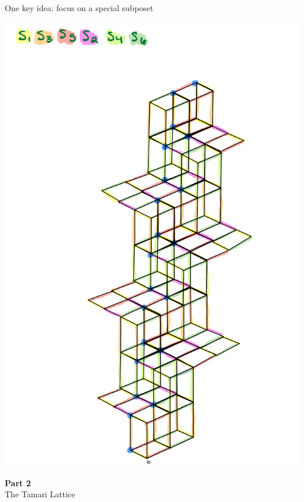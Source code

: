 \documentclass[xcolor=x11names,compress,t]{beamer}
\begin{document}
\begin{frame}{One key idea: focus on a special subposet}
    \begin{center}
        \includegraphics[scale = .105]{lattice.png}
    \end{center}
\end{frame}

\begin{frame}

    \vspace{1 cm}

    \begin{center}
        \Huge
        \textbf{Part 2}\\
        The Tamari Lattice
    \end{center}
\end{frame}
 
\end{document}
